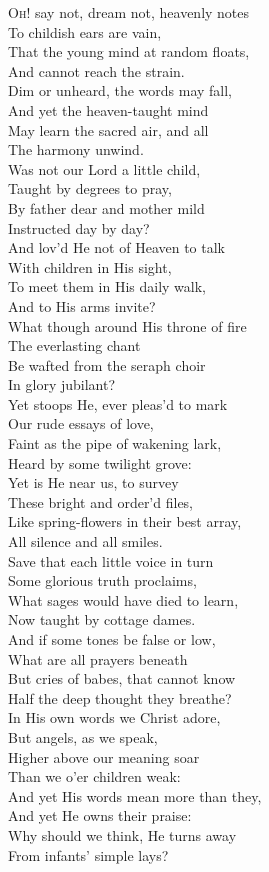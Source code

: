 \textsc{Oh}! say not, dream not, heavenly notes \\
 To childish ears are vain, \\
 That the young mind at random floats, \\
 And cannot reach the strain. \\
  Dim or unheard, the words may fall, \\
 And yet the heaven-taught mind \\
 May learn the sacred air, and all \\
 The harmony unwind. \\
  Was not our Lord a little child, \\
 Taught by degrees to pray, \\
 By father dear and mother mild \\
 Instructed day by day? \\
  And lov’d He not of Heaven to talk \\
 With children in His sight, \\
 To meet them in His daily walk, \\
 And to His arms invite? \\
  What though around His throne of fire \\
 The everlasting chant \\
 Be wafted from the seraph choir \\
 In glory jubilant? \\
  Yet stoops He, ever pleas’d to mark \\
 Our rude essays of love, \\
 Faint as the pipe of wakening lark, \\
 Heard by some twilight grove: \\
  Yet is He near us, to survey \\
 These bright and order’d files, \\
 Like spring-flowers in their best array, \\
 All silence and all smiles. \\
  Save that each little voice in turn \\
 Some glorious truth proclaims, \\
 What sages would have died to learn, \\
 Now taught by cottage dames. \\
  And if some tones be false or low, \\
 What are all prayers beneath \\
 But cries of babes, that cannot know \\
 Half the deep thought they breathe? \\
  In His own words we Christ adore, \\
 But angels, as we speak, \\
 Higher above our meaning soar \\
 Than we o’er children weak: \\
  And yet His words mean more than they, \\
 And yet He owns their praise: \\
 Why should we think, He turns away \\
 From infants’ simple lays?\\

